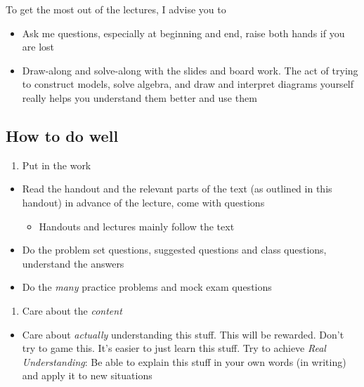 \documentclass[]{article}
\providecommand{\tightlist}{%
  \setlength{\itemsep}{0pt}\setlength{\parskip}{0pt}}
\begin{document}
\bigskip

To get the most out of the lectures, I advise you to

\begin{itemize}
\item
  Ask me questions, especially at beginning and end, raise both hands if
  you are lost
\item
  Draw-along and solve-along with the slides and board work. The act of
  trying to construct models, solve algebra, and draw and interpret
  diagrams yourself really helps you understand them better and use them
\end{itemize}

\hypertarget{how-to-do-well}{%
\subsection{How to do well}\label{how-to-do-well}}

\begin{enumerate}
\def\labelenumi{\arabic{enumi}.}
\tightlist
\item
  Put in the work
\end{enumerate}

\begin{itemize}
\item
  Read the handout and the relevant parts of the text (as outlined in
  this handout) in advance of the lecture, come with questions

  \begin{itemize}
  \tightlist
  \item
    Handouts and lectures mainly follow the text
  \end{itemize}
\item
  Do the problem set questions, suggested questions and class questions,
  understand the answers
\item
  Do the \emph{many} practice problems and mock exam questions
\end{itemize}

\begin{enumerate}
\def\labelenumi{\arabic{enumi}.}
\setcounter{enumi}{1}
\tightlist
\item
  Care about the \emph{content}
\end{enumerate}

\begin{itemize}
\tightlist
\item
  Care about \emph{actually} understanding this stuff. This will be
  rewarded. Don't try to game this. It's easier to just learn this
  stuff. Try to achieve \emph{Real Understanding}: Be able to explain
  this stuff in your own words (in writing) and apply it to new
  situations
\end{itemize}
\end{document}
